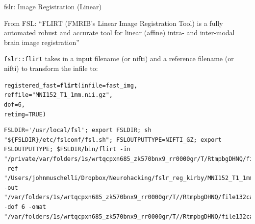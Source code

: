 \documentclass[11pt]{beamer}\usepackage[]{graphicx}\usepackage[]{color}
\makeatletter
\newcommand{\hlnum}[1]{\textcolor[rgb]{0.686,0.059,0.569}{#1}}%
\newcommand{\hlstr}[1]{\textcolor[rgb]{0.192,0.494,0.8}{#1}}%
\newcommand{\hlstd}[1]{\textcolor[rgb]{0.345,0.345,0.345}{#1}}%
\newcommand{\hlkwb}[1]{\textcolor[rgb]{0.69,0.353,0.396}{#1}}%
\newcommand{\hlkwc}[1]{\textcolor[rgb]{0.333,0.667,0.333}{#1}}%
\newcommand{\hlkwd}[1]{\textcolor[rgb]{0.737,0.353,0.396}{\textbf{#1}}}%
\newenvironment{kframe}{%
 \def\at@end@of@kframe{}%
 \ifinner\ifhmode%
  \def\at@end@of@kframe{\end{minipage}}%
  \begin{minipage}{\columnwidth}%
 \fi\fi%
 \def\FrameCommand##1{\hskip\@totalleftmargin \hskip-\fboxsep
 \colorbox{shadecolor}{##1}\hskip-\fboxsep
     \hskip-\linewidth \hskip-\@totalleftmargin \hskip\columnwidth}%
 \MakeFramed {\advance\hsize-\width
   \@totalleftmargin\z@ \linewidth\hsize
   \@setminipage}}%
 {\par\unskip\endMakeFramed%
 \at@end@of@kframe}
\newenvironment{knitrout}{}{} %
\makeatother
\begin{document}
\begin{frame}[fragile]{fslr: Image Registration (Linear)}

From FSL: ``FLIRT (FMRIB's Linear Image Registration Tool) is a fully automated robust and accurate tool for linear (affine) intra- and inter-modal brain image registration''

\verb|fslr::flirt| takes in a input filename (or nifti) and a reference filename (or nifti) to transform the infile to:
\begin{knitrout}
\color{fgcolor}\begin{kframe}
\begin{alltt}
\hlstd{registered_fast} \hlkwb{=} \hlkwd{flirt}\hlstd{(}\hlkwc{infile}\hlstd{=fast_img,}
                        \hlkwc{reffile} \hlstd{=} \hlstr{"MNI152_T1_1mm.nii.gz"}\hlstd{,}
                        \hlkwc{dof} \hlstd{=} \hlnum{6}\hlstd{,}
                        \hlkwc{retimg} \hlstd{=} \hlnum{TRUE}\hlstd{)}
\end{alltt}
\begin{verbatim}
FSLDIR='/usr/local/fsl'; export FSLDIR; sh "${FSLDIR}/etc/fslconf/fsl.sh"; FSLOUTPUTTYPE=NIFTI_GZ; export FSLOUTPUTTYPE; $FSLDIR/bin/flirt -in "/private/var/folders/1s/wrtqcpxn685_zk570bnx9_rr0000gr/T/RtmpbgDHNQ/file132ca4b8c119c.nii.gz" -ref "/Users/johnmuschelli/Dropbox/Neurohacking/fslr_reg_kirby/MNI152_T1_1mm.nii.gz" -out "/var/folders/1s/wrtqcpxn685_zk570bnx9_rr0000gr/T//RtmpbgDHNQ/file132ca4885d986" -dof 6 -omat "/var/folders/1s/wrtqcpxn685_zk570bnx9_rr0000gr/T//RtmpbgDHNQ/file132ca58d83f83.mat"  
\end{verbatim}
\end{kframe}
\end{knitrout}
\end{frame}
\end{document}
